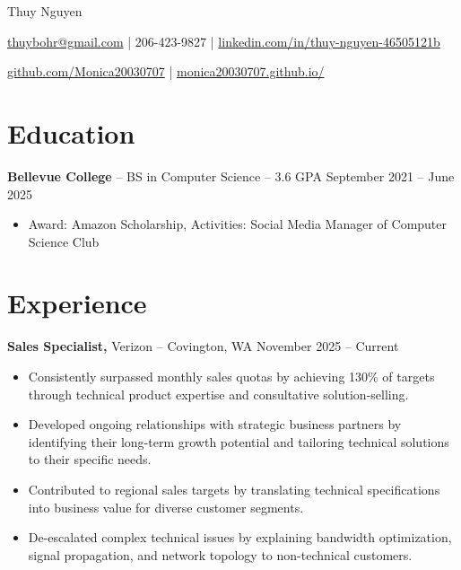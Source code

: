 \documentclass[11pt]{article}       %
\begin{document}
\centerline{\Huge Thuy Nguyen}

\vspace{5pt}

\centerline{\href{mailto:thuybohr@gmail.com}{thuybohr@gmail.com} | 206-423-9827 |
\href{https://www.linkedin.com/in/thuy-nguyen-46505121b/}{linkedin.com/in/thuy-nguyen-46505121b}}

\centerline{\href{https://github.com/Monica20030707}{github.com/Monica20030707} | 
\href{https://monica20030707.github.io/}{monica20030707.github.io/}} 

\vspace{-9pt}

\section*{Education}
\textbf{Bellevue College} -- BS in Computer Science -- 3.6 GPA \hfill September 2021 -- June 2025\\
\vspace{-9pt}
\begin{itemize}
  \item Award: Amazon Scholarship, Activities: Social Media Manager of Computer Science Club
\end{itemize}

\vspace{-18.5pt}

\section*{Experience}

\textbf{Sales Specialist,} {Verizon} -- Covington, WA \hfill November 2025 -- Current \\
\vspace{-9pt}
\begin{itemize}
  \item Consistently surpassed monthly sales quotas by achieving 130\% of targets through technical product expertise and consultative solution-selling.
  \item Developed ongoing relationships with strategic business partners by identifying their long-term growth potential and tailoring technical solutions to their specific needs.
  \item Contributed to regional sales targets by translating technical specifications into business value for diverse customer segments.
  \item De-escalated complex technical issues by explaining bandwidth optimization, signal propagation, and network topology to non-technical customers.
\end{itemize}
\end{document}
